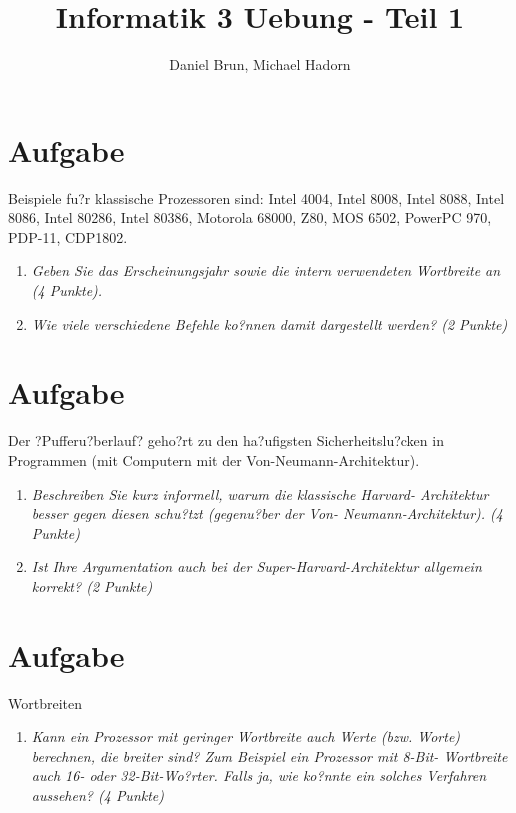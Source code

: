 \documentclass[10pt]{article}
\title{Informatik 3 Uebung - Teil 1\vspace{-2ex}}
\author{Daniel Brun, Michael Hadorn\vspace{-2ex}}
\begin{document}
\maketitle


\section{Aufgabe}
Beispiele fu?r klassische Prozessoren sind: Intel 4004, Intel 8008, Intel 8088, Intel 8086, Intel 80286, Intel 80386, Motorola 68000, Z80, MOS 6502, PowerPC 970, PDP-11, CDP1802.

\begin{enumerate}[label=\alph*)]
	\item 
	\textit{Geben Sie das Erscheinungsjahr sowie die intern verwendeten Wortbreite an (4 Punkte).}
	
	\item
	\textit{Wie viele verschiedene Befehle ko?nnen damit dargestellt werden? (2 Punkte)}
\end{enumerate}


\section{Aufgabe}
Der ?Pufferu?berlauf? geho?rt zu den ha?ufigsten Sicherheitslu?cken in Programmen (mit Computern mit der Von-Neumann-Architektur).
\begin{enumerate}[label=\alph*)]
	\item 
	\textit{Beschreiben Sie kurz informell, warum die klassische Harvard- Architektur besser gegen diesen schu?tzt (gegenu?ber der Von- Neumann-Architektur). (4 Punkte)}
	
	\item
	\textit{Ist Ihre Argumentation auch bei der Super-Harvard-Architektur allgemein korrekt? (2 Punkte)}
\end{enumerate}


\section{Aufgabe}
Wortbreiten
\begin{enumerate}[label=\alph*)]
	\item 
	\textit{Kann ein Prozessor mit geringer Wortbreite auch Werte (bzw. Worte) berechnen, die breiter sind? Zum Beispiel ein Prozessor mit 8-Bit- Wortbreite auch 16- oder 32-Bit-Wo?rter. Falls ja, wie ko?nnte ein solches Verfahren aussehen? (4 Punkte)}
	
\end{enumerate}
\newpage
\end{document}
